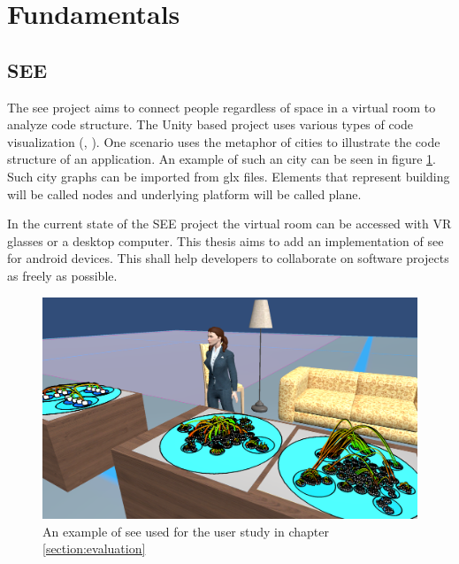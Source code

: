 \section{Fundamentals}
\label{sec:fundamentals}

\subsection{SEE}
The \gls{see} project aims to connect people regardless of space in a virtual room to analyze code structure. 
The Unity based project uses various types of code visualization (\cite{koschke}, \cite{DBLP:conf/iwsc/KoschkeS21}). 
One scenario uses the metaphor of cities to illustrate the code structure of an application.
An example of such an \gls{city} can be seen in figure \ref{fig:see_example}.
Such city graphs can be imported from \gls{glx} files.
Elements that represent building will be called \glspl{node} and underlying platform will be called \gls{plane}.

In the current state of the SEE project the virtual room can be accessed with VR glasses or a desktop computer.
This thesis aims to add an implementation of \gls{see} for \gls{android} devices.
This shall help developers to collaborate on software projects as freely as possible.
\begin{figure}[htb]
    \centering
    \includegraphics[width=1\textwidth]{Fundamentals/img/SEE.png}
    \caption{An example of \gls{see} used for the user study in chapter \ref{section:evaluation}}
    \label{fig:see_example}
\end{figure}
